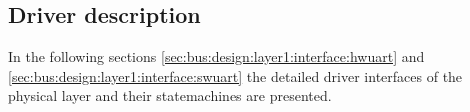 \subsection{Driver description}
\label{sec:bus:design:layer1:interface}

In the following sections \ref{sec:bus:design:layer1:interface:hwuart}  and \ref{sec:bus:design:layer1:interface:swuart}  
the detailed driver interfaces of the physical layer and their statemachines are presented.



